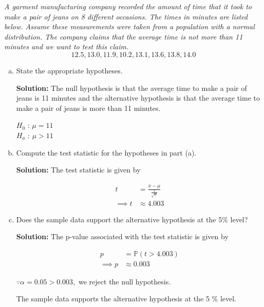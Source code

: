 \documentclass[12pt,letterpaper]{article}
\begin{document}
\textit{A garment manufacturing company recorded the amount of time that it took to make a pair of jeans on 8 different occasions. The times in minutes are listed below. Assume these measurements were taken from a population with a normal distribution. The company claims that the average time is not more than 11 minutes and we want to test this claim.}
$$12.5, 13.0, 11.9, 10.2, 13.1, 13.6, 13.8, 14.0$$

\begin{enumerate}[a.] \setlength{\itemsep}{30pt}
  \item State the appropriate hypotheses.
  
  \textbf{Solution:}
  The null hypothesis is that the average time to make a pair of jeans is 11 minutes and the alternative hypothesis is that the average time to make a pair of jeans is more than 11 minutes.

  $H_0$ : $\mu = 11$\\
  $H_a$ : $\mu > 11$
  \item Compute the test statistic for the hypotheses in part (a).

  \textbf{Solution:}
  The test statistic is given by

  \begin{equation}
    \begin{split}
      t &= \frac{\overline{x} - \mu}{\frac{s}{\sqrt{n}}}\\
      \implies t &\approx 4.003
    \end{split}
  \end{equation}

  \item Does the sample data support the alternative hypothesis at the 5\% level?

  \textbf{Solution:}
  The p-value associated with the test statistic is given by

  \begin{equation}
    \begin{split}
      p &= \mathbb{P}(t > 4.003)\\
      \implies p &\approx 0.003
    \end{split}
  \end{equation}

  $\because \alpha = 0.05 > 0.003,$ we reject the null hypothesis.

  The sample data supports the alternative hypothesis at the 5 \% level.
  \end{enumerate}
\newpage

\end{document}
